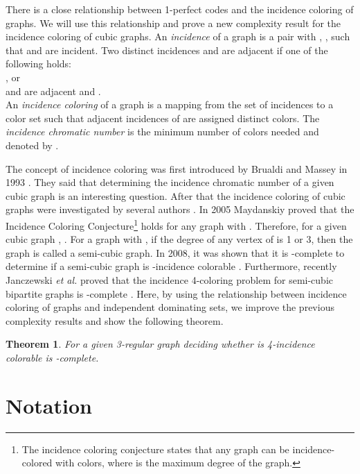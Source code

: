 \documentclass[
final
]{dmtcs-episciences}
\newtheorem{prethm}{{\bf Theorem}}
\newenvironment{thm}{\begin{prethm}{\hspace{-0.5
				em}{\bf}}}{\end{prethm}}
\begin{document}
There is a close relationship between 1-perfect codes and the incidence coloring of graphs. We will use this relationship and prove a new complexity result for  the incidence coloring of  cubic graphs.
An {\it incidence} of a graph  is a pair  with , , such that  and  are
incident. Two distinct incidences  and  are adjacent if one of the following holds:\\
 , or\\
  and  are adjacent and .\\
An {\it incidence coloring} of a graph
 is a mapping from the set of incidences to a color set such that adjacent incidences of
 are assigned distinct colors. The {\it incidence chromatic number} is the minimum number of
colors needed and denoted by .

The concept of incidence coloring was first introduced by Brualdi and   Massey  in 1993 \cite{Kh2}. They said that
determining the incidence chromatic number of a given  cubic graph is an interesting question. After that the incidence coloring of cubic graphs were investigated by several authors \cite{Kh5, MR3636883, Kh4, Kh6}.
In 2005 Maydanskiy proved that the Incidence Coloring Conjecture\footnote{The incidence coloring conjecture  states that any graph can be incidence-colored with
	 colors, where  is the maximum degree of the graph.} holds for any graph with
 \cite{Kh4}. Therefore, for  a given cubic graph , .
For a graph  with , if the degree of any vertex of  is 1 or 3, then the graph  is called a semi-cubic
graph. In 2008, it was shown that it is -complete to determine if a semi-cubic graph is -incidence colorable \cite{Kh5}. 
Furthermore, recently Janczewski {\it et al.} proved that the incidence 4-coloring problem for semi-cubic bipartite graphs is -complete \cite{janczewski2017incidence}. 
Here, by using the relationship between 
incidence coloring of graphs and independent dominating sets,
we improve the previous complexity results  and show the following theorem.


\begin{thm}\label{TF}
	For a given 3-regular graph  deciding whether  is 4-incidence colorable  is -complete.
\end{thm}

\section{Notation}
\end{document}

